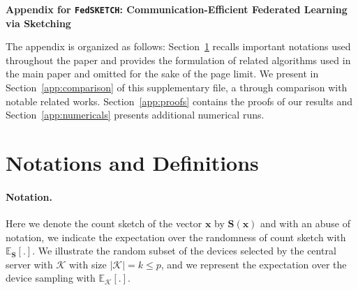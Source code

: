 \documentclass[sigconf, anonymous, review]{acmart}
\begin{document}


\newpage
\appendix
%

\onecolumn

{\centering
  {\Large\bfseries Appendix for \texttt{FedSKETCH}: Communication-Efficient Federated Learning
via Sketching \par}}






The appendix is organized as follows:
Section~\ref{app:notations} recalls important notations used throughout the paper and provides the formulation of related algorithms used in the main paper and omitted for the sake of the page limit.
We present in Section~\ref{app:comparison} of this supplementary file, a through comparison with notable related works.
Section~\ref{app:proofs} contains the proofs of our results and Section~\ref{app:numericals} presents additional numerical runs.

\section{Notations and Definitions}\label{app:notations}

\paragraph{Notation.} Here we denote the count sketch of the vector $\boldsymbol{x}$ by $\mathbf{S}(\boldsymbol{x})$ and with an abuse of notation, we indicate the expectation over the randomness of count sketch with $\mathbb{E}_{\mathbf{S}}[.]$. 
We illustrate the random subset of the devices selected by the central server with $\mathcal{K}$ with size $|\mathcal{K}|=k\leq p$, and we represent the expectation over the device sampling with $\mathbb{E}_{\mathcal{K}}[.]$. 
\end{document}
